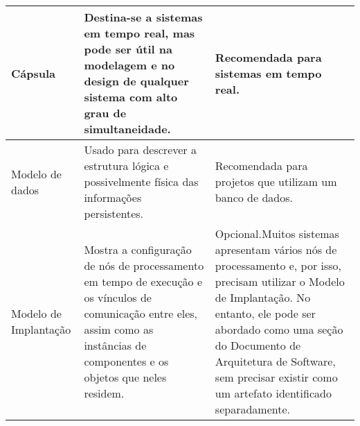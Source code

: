 \begin{longtable}{||p{3cm}|p{5cm}|p{5cm}||}
Cápsula                                            & Destina-se a sistemas em tempo real, mas pode ser útil na modelagem e no design de qualquer sistema com alto grau de simultaneidade.                                                                                                                                                                                                                                                                              & Recomendada para sistemas em tempo real.                                                                                                                                                                                                                                                                                                                                         \\ \hline
Modelo de dados                                    & Usado para descrever a estrutura lógica e possivelmente física das informações persistentes.                                                                                                                                                                                                                                                                                                                      & Recomendada para projetos que utilizam um banco de dados.                                                                                                                                                                                                                                                                                                                        \\ \hline
Modelo de Implantação                              & Mostra a configuração de nós de processamento em tempo de execução e os vínculos de comunicação entre eles, assim como as instâncias de componentes e os objetos que neles residem.                                                                                                                                                                                                                               & Opcional.Muitos sistemas apresentam vários nós de processamento e, por isso, precisam utilizar o Modelo de Implantação. No entanto, ele pode ser abordado como uma seção do Documento de Arquitetura de Software, sem precisar existir como um artefato identificado separadamente.                                                                                              \\ \hline

\end{longtable}
